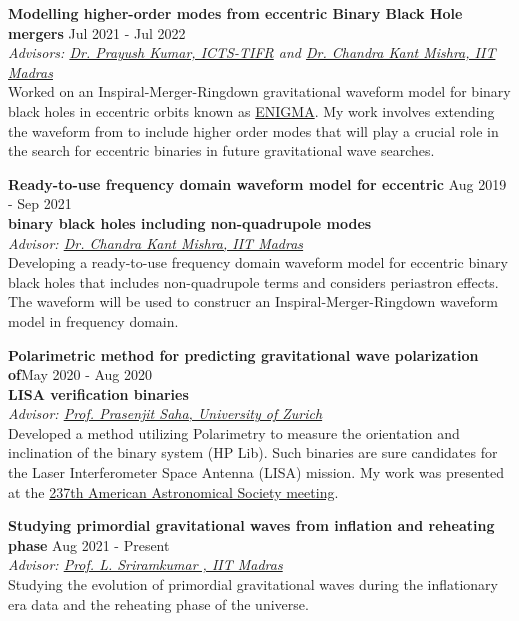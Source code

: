 \documentclass[margin, centered]{res}
\begin{document}
\begin{resume}
\textbf{Modelling higher-order modes from eccentric Binary Black Hole mergers} \hfill Jul 2021 - Jul 2022\\
\emph{Advisors:  \href{https://www.icts.res.in/people/prayush-kumar}{Dr. Prayush Kumar, ICTS-TIFR} and \href{https://physics.iitm.ac.in/ckm}{Dr. Chandra Kant Mishra, IIT Madras}} 
\vspace{0.1 cm}\\
    Worked on an Inspiral-Merger-Ringdown gravitational waveform model
    for binary black holes in eccentric orbits known as \href{https://journals.aps.org/prd/abstract/10.1103/PhysRevD.97.024031}{ENIGMA}. My work involves extending the waveform from to
    include higher order modes that will play a crucial role in the search for eccentric binaries in future gravitational wave searches.


\textbf{Ready-to-use frequency domain waveform model for eccentric } \hfill Aug 2019 - Sep 2021 \\ \textbf{binary black holes including non-quadrupole modes}  \\ 
\emph{Advisor: \href{https://physics.iitm.ac.in/ckm}{Dr. Chandra Kant Mishra, IIT Madras}}
\vspace{0.1 cm}\\
Developing a ready-to-use frequency domain waveform model for eccentric binary black holes that includes non-quadrupole terms and considers periastron effects. The waveform will be used to
construcr an Inspiral-Merger-Ringdown waveform model in frequency domain.


\textbf{Polarimetric method for predicting gravitational wave polarization of}\hfill May 2020 - Aug 2020 \\ \textbf{LISA verification binaries}\\
\emph{Advisor: \href{https://www.ctac.uzh.ch/en/Research/research-groups/Prasenjit-Saha.html}{Prof. Prasenjit Saha, University of Zurich} }
\vspace{0.1 cm}\\
Developed a method utilizing Polarimetry to measure the orientation and inclination of the binary system (HP Lib). Such binaries are sure candidates for the  Laser Interferometer Space Antenna (LISA) mission.
My work was presented at the \href{https://aas.org/meetings/aas237}{\color{C2}237th American Astronomical Society meeting}.


\textbf{Studying primordial gravitational waves from inflation and reheating phase} \hfill Aug 2021 - Present \\
\emph{Advisor: \href{https://physics.iitm.ac.in/~sriram/index.html}{Prof. L. Sriramkumar , IIT Madras}}
\vspace{0.1 cm}\\
Studying the evolution of primordial gravitational waves during the inflationary era data and the reheating phase of the universe. 







\end{resume}
\end{document}

